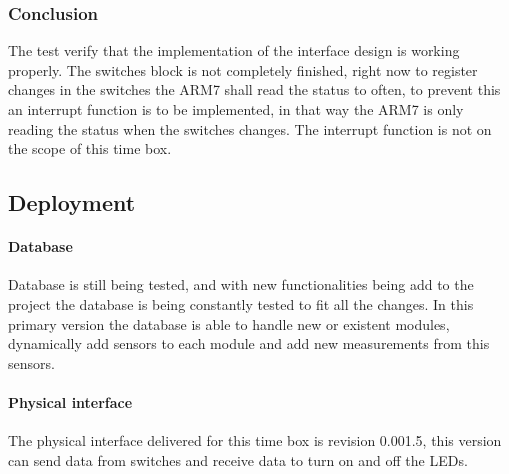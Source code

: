 \subsubsection{Conclusion}
The test verify that the implementation of the interface design is working properly. The switches block is not completely finished, right now to register changes in the switches the ARM7 shall read the status to often, to prevent this an interrupt function is to be implemented, in that way the ARM7 is only reading the status when the switches changes. The interrupt function is not on the scope of this time box.
\subsection{Deployment}
\paragraph{Database}
	Database is still being tested, and with new functionalities being add to the project the database is being constantly tested to fit all the changes.
	In this primary version the database is able to handle new or existent modules, dynamically  add sensors to each module and add new measurements from this sensors.
\paragraph{Physical interface}
	The physical interface delivered for this time box is revision 0.001.5, this version can send data from switches and receive data to turn on and off the LEDs.
